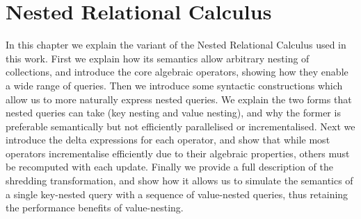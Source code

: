 \chapter{Nested Relational Calculus}

In this chapter we explain the variant of the Nested Relational Calculus used in this work.
First we explain how its semantics allow arbitrary nesting of collections, and introduce the core algebraic operators, showing how they enable a wide range of queries. Then we introduce some syntactic constructions which allow us to more naturally express nested queries. We explain the two forms that nested queries can take (key nesting and value nesting), and why the former is preferable semantically but not efficiently parallelised or incrementalised. Next we introduce the delta expressions for each operator, and show that while most operators incrementalise efficiently due to their algebraic properties, others must be recomputed with each update. Finally we provide a full description of the shredding transformation, and show how it allows us to simulate the semantics of a single key-nested query with a sequence of value-nested queries, thus retaining the performance benefits of value-nesting.


